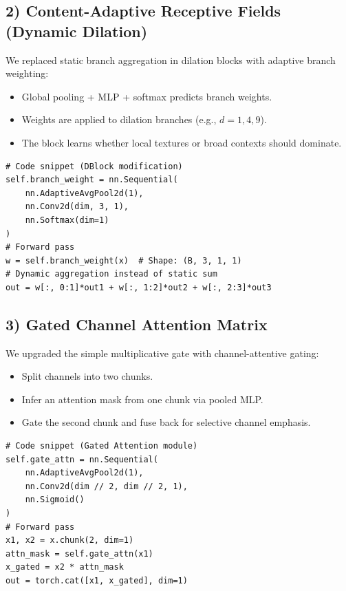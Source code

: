 \documentclass[10pt,twocolumn]{article}
\begin{document}
\subsection{2) Content-Adaptive Receptive Fields (Dynamic Dilation)}
We replaced static branch aggregation in dilation blocks with adaptive branch weighting:
\begin{itemize}
  \item Global pooling + MLP + softmax predicts branch weights.
  \item Weights are applied to dilation branches (e.g., $d=1,4,9$).
  \item The block learns whether local textures or broad contexts should dominate.
\end{itemize}
\begin{lstlisting}
# Code snippet (DBlock modification)
self.branch_weight = nn.Sequential(
    nn.AdaptiveAvgPool2d(1),
    nn.Conv2d(dim, 3, 1),
    nn.Softmax(dim=1)
)
# Forward pass
w = self.branch_weight(x)  # Shape: (B, 3, 1, 1)
# Dynamic aggregation instead of static sum
out = w[:, 0:1]*out1 + w[:, 1:2]*out2 + w[:, 2:3]*out3
\end{lstlisting}

\subsection{3) Gated Channel Attention Matrix}
We upgraded the simple multiplicative gate with channel-attentive gating:
\begin{itemize}
  \item Split channels into two chunks.
  \item Infer an attention mask from one chunk via pooled MLP.
  \item Gate the second chunk and fuse back for selective channel emphasis.
\end{itemize}
\begin{lstlisting}
# Code snippet (Gated Attention module)
self.gate_attn = nn.Sequential(
    nn.AdaptiveAvgPool2d(1),
    nn.Conv2d(dim // 2, dim // 2, 1),
    nn.Sigmoid()
)
# Forward pass
x1, x2 = x.chunk(2, dim=1)
attn_mask = self.gate_attn(x1)
x_gated = x2 * attn_mask
out = torch.cat([x1, x_gated], dim=1)
\end{lstlisting}
\end{document}
